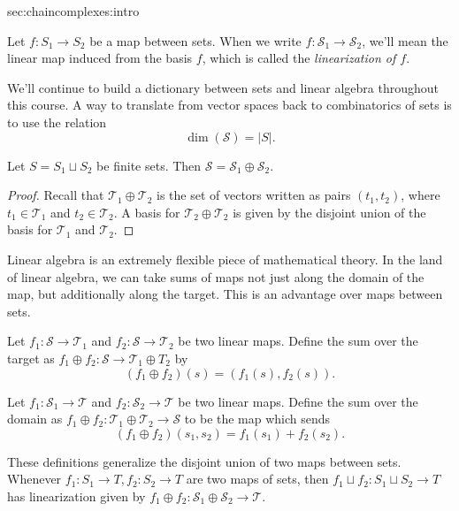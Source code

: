 \begin{stationconnection}{sec:chaincomplexes:intro}
\begin{definition}
Let $f:S_1\to S_2$ be a map between sets. When we  write  $f: \mathcal S_1\to \mathcal S_2$, we'll mean the linear map induced from the basis $f$, which is called the \emph{linearization of $f$}.
\end{definition}
We'll continue to build a dictionary between sets and linear algebra throughout this course. A way to translate from vector spaces back to combinatorics of sets is to use the relation 
\[\dim(\mathcal S)=|S|.\]
\begin{claim}
Let $S= S_1\sqcup S_2$ be finite sets. Then $\mathcal S= \mathcal S_1\oplus \mathcal S_2. $
\end{claim}
\begin{proof}
Recall that $\mathcal T_1\oplus \mathcal T_2$ is the set of vectors written as pairs $(t_1, t_2)$, where $t_1\in \mathcal T_1$ and $t_2\in \mathcal T_2$. A basis for $\mathcal T_2\oplus \mathcal T_2$ is given by the disjoint union of the basis for $\mathcal T_1$ and $\mathcal T_2$. 
\end{proof}
Linear algebra is an extremely flexible piece of mathematical theory. In the land of linear algebra, we can take sums of maps not just along the domain of the map, but additionally along the target. This is an advantage over maps between sets.  
\begin{definition} Let $f_1: \mathcal S\to \mathcal T_1$ and $f_2: \mathcal S\to \mathcal T_2$ be two linear maps. Define the sum over the target as $f_1\oplus f_2: \mathcal S\to \mathcal T_1\oplus T_2$ by 
\[(f_1\oplus f_2)(s)=(f_1(s), f_2(s)).\]
\end{definition}
\begin{definition} Let $f_1: \mathcal S_1\to \mathcal T$ and $f_2: \mathcal S_2 \to \mathcal T$ be two linear maps. Define the sum over the domain as $f_1\oplus f_2: \mathcal T_1\oplus \mathcal T_2\to \mathcal S$ to be the map which sends 
\[ (f_1\oplus f_2)(s_1, s_2)=f_1(s_1)+f_2(s_2).\]
\end{definition}
These definitions generalize the disjoint union of two maps between sets. Whenever $f_1:S_1\to T, f_2: S_2\to T$ are two maps of sets, then $f_1\sqcup f_2: S_1\sqcup S_2\to T$ has linearization given by $f_1\oplus f_2: \mathcal S_1\oplus \mathcal S_2\to \mathcal T$. 
\begin{comment}
Suppose we have a decomposition of a set $C$ into subsets $S_1$ and $S_2$, which we might represent by the following commutative diagram. 
\[
\begin{tikzcd}
A= S_1\cap S_2\arrow{r}{i_1} \arrow{d}{i_2}& S_1 \arrow{d}{j_1}\\

\end{comment}
\end{stationconnection}
